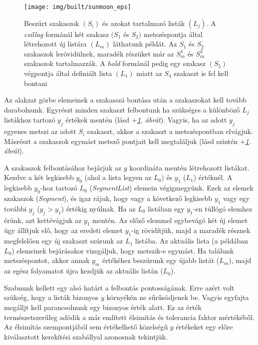 \documentclass[12pt]{report}
\theoremstyle{definition}
\newcommand{\func}[1]{{\textsl{#1}}}
\begin{document}
  \begin{figure}
    \centering \texttt{[image: img/built/sunmoon\_eps]}
    \caption{\label{fig:sunmoon} Beszúrt
    szakaszok $(S_i)$ és azokat tartalmazó listák $(L_j)$. A \emph{csillag}
    formánál két szakasz $(S_1$ és $S_2)$ metszéspontja által létrehozott új
    listára $(L_m)$ láthatunk példát. Az $S_1$ és $S_2$ szakaszok
    lerövidülnek, maradék részüket már az $S_m^1$ és $S_m^2$ szakaszok
    tartalmazzák. A \emph{hold} formánál pedig egy szakasz $(S_5)$
    végpontja által definiált lista $(L_1)$ miatt az $S_4$ szakaszt is fel
    kell bontani}
  \end{figure}

Az alakzat görbe elemeinek a szakasszá bontása után a szakaszokat kell tovább
darabolnunk. Egyrészt minden szakaszt felbontunk ha szükséges a különböző $L_j$
listákhoz tartozó $y_j$ értékek mentén (lásd \az+\emph{\ref{fig:sunmoon}.
ábrát}). Vagyis, ha az adott $y_j$ egyenes metszi az adott $S_i$ szakaszt,
akkor a szakaszt a metszéspontban elvágjuk. Másrészt a szakaszok egymást metsző
pontjait kell megtaláljuk (lásd szintén \az+\emph{\ref{fig:sunmoon}. ábrát}).

A szakaszok felbontásához bejárjuk az $y$ koordináta mentén létrehozott
listákat. Kezdve a két legkisebb $y_0$ (ahol a lista legyen az $L_0$) és $y_1$
($L_1$) értéknél. A legkisebb $y_0$-hoz tartozó $L_0$ (\func{SegmentList})
elemein végigmegyünk. Ezek az elemek szakaszok (\func{Segment}), és igaz rájuk,
hogy vagy a következő legkisebb $y_1$ vagy egy további $y_j$ ($y_j > y_1$)
értékig nyúlnak. Ha az $L_0$ listában egy $y_1$-en túllógó elemhez érünk, azt
kettévágjuk az $y_1$ mentén. Az előző elemmel egybevágó két új elemet úgy
állítjuk elő, hogy az eredeti elemet $y_1$-ig rövidítjük, majd a maradék
résznek megfelelően egy új szakaszt szúrunk az $L_1$ listába. Az aktuális lista
(a példában $L_0$) elemeinek bejárásakor vizsgáljuk, hogy metszik-e egymást. Ha
találunk metszéspontot, akkor annak $y_m$ értékéhez beszúrunk egy újabb listát
($L_m$), majd az egész folyamatot újra kezdjük az aktuális listán ($L_0$).

Szabnunk kellett egy alsó határt a felbontás pontosságának. Erre azért volt
szükség, hogy a listák bizonyos $y$ környékén ne sűrűsödjenek be. Vagyis
egyfajta megálljt kell parancsolnunk egy bizonyos érték alatt. Ez az érték
természetszerűleg adódik a már említett élsimítás és tolerancia faktor
mértékéből. Az élsimítás szempontjából sem értékelhető közelségű $y$ értékeket
egy előre kiválasztott kerekítési szabállyal azonosnak tekintjük.
\end{document}
